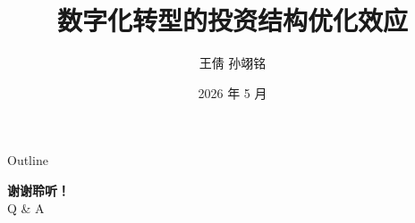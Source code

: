 \documentclass[aspectratio=169]{beamer}
\title{数字化转型的投资结构优化效应}
\author[王倩 \& 孙翊铭（吉林大学）]{
  王\quad 倩\inst{1,2}
  \qquad
  孙翊铭\inst{2}
}
\institute[吉林大学经济学院]{
  \inst{1} 吉林大学国有经济研究中心
  \and
  \inst{2} 吉林大学经济学院
}
\date{2026 年 5 月}
\begin{document}
\begin{frame}
  \titlepage
\end{frame}

\begin{frame}{Outline}
    \tableofcontents
\end{frame}






%

% 


\begin{frame}
  \vspace*{\fill}
  \begin{center}
    {\Huge \textbf{谢谢聆听！}} \\[1em]
    {\large Q \& A}
  \end{center}
  \vspace*{\fill}
  
\end{frame}
\end{document}
